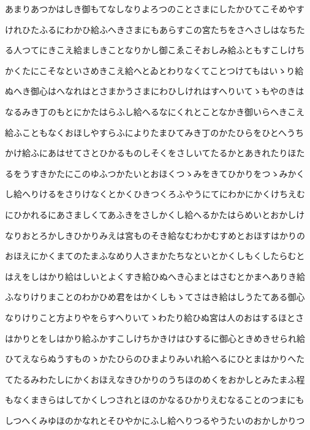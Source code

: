 \documentclass[a4paper,11pt,landscape]{ltjtarticle}
\begin{document}
あまりあつかはしき御もてなしなりよろつのことさまにしたかひてこそめやす
\par\medskip
けれひたふるにわかひ給ふへきさまにもあらすこの宮たちをさへさしはなちた
\par\medskip
る人つてにきこえ給ましきことなりかし御こゑこそおしみ給ふともすこしけち
\par\medskip
かくたにこそなといさめきこえ給へとゐとわりなくてことつけてもはいゝり給
\par\medskip
ぬへき御心はへなれはとさまかうさまにわひしけれはすへりいてゝもやのきは
\par\medskip
なるみき丁のもとにかたはらふし給へるなにくれとことなかき御いらへきこえ
\par\medskip
給ふこともなくおほしやすらふによりたまひてみき丁のかたひらをひとへうち
\par\medskip
かけ給ふにあはせてさとひかるものしそくをさしいてたるかとあきれたりほた
\par\medskip
るをうすきかたにこのゆふつかたいとおほくつゝみをきてひかりをつゝみかく
\par\medskip
し給へりけるをさりけなくとかくひきつくろふやうにてにわかにかくけちえむ
\par\medskip
にひかれるにあさましくてあふきをさしかくし給へるかたはらめいとおかしけ
\par\medskip
なりおとろかしきひかりみえは宮ものそき給なむわかむすめとおほすはかりの
\par\medskip
おほえにかくまてのたまふなめり人さまかたちなといとかくしもくしたらむと
\par\medskip
はえをしはかり給はしいとよくすき給ひぬへき心まとはさむとかまへありき給
\par\medskip
ふなりけりまことのわかひめ君をはかくしもゝてさはき給はしうたてある御心
\par\medskip
なりけりこと方よりやをらすへりいてゝわたり給ひぬ宮は人のおはするほとさ
\par\medskip
はかりとをしはかり給ふかすこしけちかきけはひするに御心ときめきせられ給
\par\medskip
ひてえならぬうすものゝかたひらのひまよりみいれ給へるにひとまはかりへた
\par\medskip
てたるみわたしにかくおほえなきひかりのうちほのめくをおかしとみたまふ程
\par\medskip
もなくまきらはしてかくしつされとほのかなるひかりえむなることのつまにも
\par\medskip
しつへくみゆほのかなれとそひやかにふし給へりつるやうたいのおかしかりつ
\par\medskip
\end{document}
